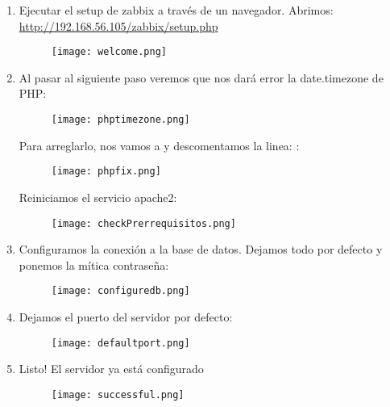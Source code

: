 \begin{enumerate}
	\item Ejecutar el setup de zabbix a través de un navegador. Abrimos: \\
	\url{http://192.168.56.105/zabbix/setup.php}
	\begin{figure}[H]
		\centering
		\texttt{[image: welcome.png]} 
	\end{figure}

	\item Al pasar al siguiente paso veremos que nos dará error la date.timezone de PHP:
	\begin{figure}[H]
		\centering
		\texttt{[image: phptimezone.png]} 
	\end{figure}
Para arreglarlo, nos vamos a  y descomentamos la linea: :
	\begin{figure}[H]
	\centering
	\texttt{[image: phpfix.png]} 
	\end{figure}
Reiniciamos el servicio apache2: 
	\begin{figure}[H]
	\centering
	\texttt{[image: checkPrerrequisitos.png]} 
	\end{figure}

	\item Configuramos la conexión a la base de datos. Dejamos todo por defecto y ponemos la mítica contraseña: 
	\begin{figure}[H]
	\centering
	\texttt{[image: configuredb.png]} 
	\end{figure}
	
	\item Dejamos el puerto del servidor por defecto:
	\begin{figure}[H]
	\centering
	\texttt{[image: defaultport.png]} 
	\end{figure}

	\item Listo! El servidor ya está configurado
	\begin{figure}[H]
	\centering
	\texttt{[image: successful.png]} 
	\end{figure}
\end{enumerate}


